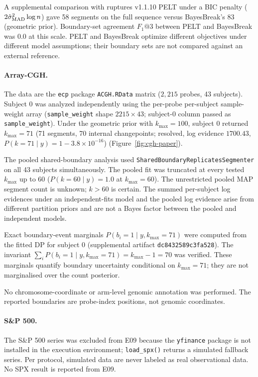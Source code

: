A supplemental comparison with ruptures v1.1.10 PELT under a BIC penalty ($2 \hat{\sigma}^2_{\rm MAD} \log n$) gave 58 segments on the full sequence versus BayesBreak's 83 (geometric prior). Boundary-set agreement $F_1@3$ between PELT and BayesBreak was $0.0$ at this scale. PELT and BayesBreak optimize different objectives under different model assumptions; their boundary sets are not compared against an external reference.



\paragraph{Array-CGH.}
The data are the \texttt{ecp} package \texttt{ACGH.RData} matrix ($2{,}215$ probes, 43 subjects). Subject 0 was analyzed independently using the per-probe per-subject sample-weight array (\texttt{sample\_weight} shape $2215 \times 43$; subject-0 column passed as \texttt{sample\_weight}). Under the geometric prior with $k_{\max}=100$, subject 0 returned $k_{\max}=71$ (71 segments, 70 internal changepoints; resolved, log evidence $1700.43$, $P(k=71 \mid y) = 1 - 3.8 \times 10^{-16}$) (Figure~\ref{fig:cgh-paper}).

The pooled shared-boundary analysis used \texttt{SharedBoundaryReplicatesSegmenter} on all 43 subjects simultaneously. The pooled fit was truncated at every tested $k_{\max}$ up to 60 ($P(k=60 \mid y) = 1.0$ at $k_{\max}=60$). The unrestricted pooled MAP segment count is unknown; $k > 60$ is certain. The summed per-subject log evidences under an independent-fits model and the pooled log evidence arise from different partition priors and are not a Bayes factor between the pooled and independent models.

Exact boundary-event marginals $P(b_i = 1 \mid y, k_{\max}=71)$ were computed from the fitted DP for subject 0 (supplemental artifact \texttt{dc8432589c3fa528}). The invariant $\sum_i P(b_i = 1 \mid y, k_{\max}=71) = k_{\max} - 1 = 70$ was verified. These marginals quantify boundary uncertainty conditional on $k_{\max}=71$; they are not marginalised over the count posterior.

No chromosome-coordinate or arm-level genomic annotation was performed. The reported boundaries are probe-index positions, not genomic coordinates.



\paragraph{S\&P 500.}
The S\&P 500 series was excluded from E09 because the \texttt{yfinance} package is not installed in the execution environment; \texttt{load\_spx()} returns a simulated fallback series. Per protocol, simulated data are never labeled as real observational data. No SPX result is reported from E09.

